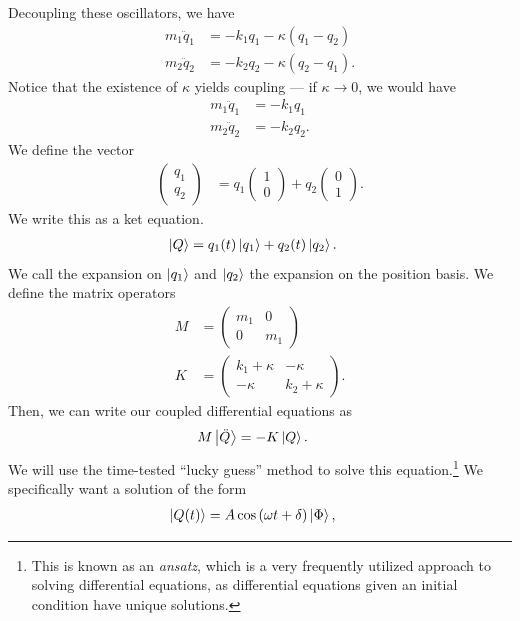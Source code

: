 \documentclass[10pt]{mypackage}
\begin{document}
Decoupling these oscillators, we have
\begin{align*}
  m_1\ddot{q}_1 &= -k_1q_1 - \kappa\left(q_1 - q_2\right)\\
  m_2\ddot{q}_2 &= -k_2q_2 - \kappa\left(q_2 - q_1\right).
\end{align*}
Notice that the existence of $\kappa$ yields coupling --- if $\kappa\rightarrow 0$, we would have
\begin{align*}
  m_1\ddot{q}_1 &= -k_1q_1\\
  m_2\ddot{q}_2 &= -k_2q_2.
\end{align*}
We define the vector
\begin{align*}
  \begin{pmatrix}q_1\\q_2\end{pmatrix} &= q_1 \begin{pmatrix}1\\0\end{pmatrix} + q_2 \begin{pmatrix}0\\1\end{pmatrix}.
\end{align*}
We write this as a ket equation.
\begin{align*}
  \ket{Q} &= q_1(t)\ket{q_1}+q_2(t)\ket{q_2}.
\end{align*}
We call the expansion on $\ket{q_1}$ and $\ket{q_2}$ the expansion on the position basis. We define the matrix operators
\begin{align*}
  M &= \begin{pmatrix}m_1 & 0 \\ 0 & m_1\end{pmatrix}\\
  K &= \begin{pmatrix}k_1 + \kappa & -\kappa \\ -\kappa & k_2 + \kappa\end{pmatrix}.
\end{align*}
Then, we can write our coupled differential equations as
\begin{align*}
  M\ket{\ddot{Q}} &= -K\ket{Q}.
\end{align*}
We will use the time-tested ``lucky guess'' method to solve this equation.\footnote{This is known as an \textit{ansatz}, which is a very frequently utilized approach to solving differential equations, as differential equations given an initial condition have unique solutions.} We specifically want a solution of the form
\begin{align*}
  \ket{Q(t)} &= A\cos\left(\omega t + \delta\right)\ket{\Phi},
\end{align*}
\end{document}
